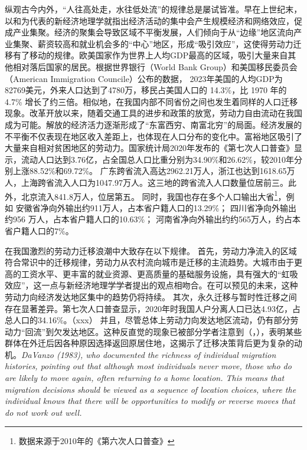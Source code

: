 \documentclass[a4paper,12pt,oneside]{book} %
\begin{document}
纵观古今内外，“人往高处走，水往低处流”的规律总是屡试皆准。早在上世纪末，以\cite{krugmanIncreasingReturnsEconomic1991}和\cite{fujitaSpatialEconomyCities1999}为代表的新经济地理学就指出经济活动的集中会产生规模经济和网络效应，促成产业集聚。经济的聚集会导致区域不平衡发展，人们倾向于从“边缘”地区流向产业集聚、薪资较高和就业机会多的“中心”地区，形成“吸引效应”，这使得劳动力迁移有了移动的规律。欧美国家作为世界上人均GDP最高的区域，吸引大量来自其他相对落后国家的居民。根据世界银行（World Bank Group）和美国移民委员会（American Immigration Councile）公布的数据，
2023年美国的人均GDP为82769美元，外来人口达到了4780万，移民占美国人口的 14.3\%，比 1970 年的 4.7\% 增长了约三倍。相似地，在我国内部不同省份之间也发生着同样的人口迁移现象。改革开放以来，随着交通工具的进步和政策的放宽，劳动力自由流动在我国成为可能。解放的经济活力逐渐形成了“东富西穷、南富北穷”的局面。经济发展的不平衡不仅表现在地区收入差距上，也体现在人口分布的变化中。富裕地区吸引了大量来自相对贫困地区的劳动力。国家统计局2020年发布的《第七次人口普查》显示，流动人口达到3.76亿，占全国总人口比重分别为34.90\%和26.62\%，较2010年分别上涨88.52\%和69.72\%。
广东跨省流入高达2962.21万人，浙江也达到1618.65万人，上海跨省流入人口为1047.97万人。这三地的跨省流入人口数量位居前三。此外，北京流入841.8万人，位居第五。
同时，我国也存在多个人口输出大省\footnote{数据来源于2010年的《第六次人口普查》}，例如
安徽省净向外输出约911万人，占本省户籍人口的13.29\%；
四川省净向外输出约956 万人，占本省户籍人口的10.63\%；
河南省净向外输出约约565万人，约占本省户籍人口的7\%。

在我国激烈的劳动力迁移浪潮中大致存在以下规律。
首先，劳动力净流入的区域符合常识中的迁移规律，劳动力从农村流向城市是迁移的主流趋势。大城市由于更高的工资水平、更丰富的就业资源、更高质量的基础服务设施，具有强大的“虹吸效应”，这一点与新经济地理学学者提出的观点相吻合。在可以预见的未来，这种劳动力向经济发达地区集中的趋势仍将持续。
其次，永久迁移与暂时性迁移之间存在显著差异。第七次人口普查显示，2020年时我国人户分离人口已达4.93亿，占总人口的34.16\%。（xxx）
并且，尽管总体上劳动力向发达地区流动，仍有部分劳动力“回流”到欠发达地区。这种反直觉的现象已被部分学者注意到（\cite{ShiZhiLeiJiaTingBingFuJiaTingJueCeYuNongCunQianYiLaoDongLiHuiLiu2012}，\cite{RenYuanNongCunWaiChuLaoDongLiHuiLiuQianYiDeYingXiangYinSuHeHuiLiuXiaoYing2017}），表明某些群体在外迁后因各种原因选择返回原居住地，这揭示了迁移决策背后更为复杂的动机。\textit{DaVanzo (1983), who documented the richness  of individual migration histories, pointing out that although most individuals never move,  those who do are likely to move again, often returning to a home location. This means  that migration decisions should be viewed as a sequence of location choices, where the  individual knows that there will be opportunities to modify or reverse moves that do not  work out well.}
\end{document}
